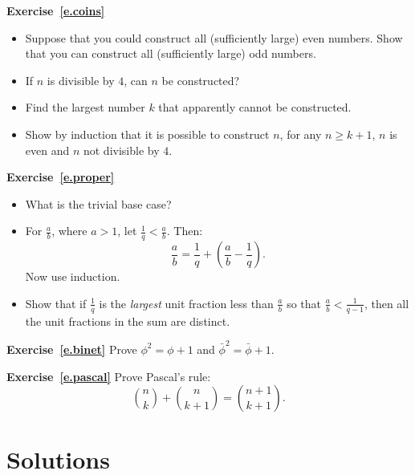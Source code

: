 \documentclass[11pt,a4paper]{report}
\begin{document}
\textbf{Exercise~\ref{e.coins}}
\begin{itemize}
\item Suppose that you could construct all (sufficiently large) even numbers. Show that you can construct all (sufficiently large) odd numbers.
\item If $n$ is divisible by $4$, can $n$ be constructed?
\item Find the largest number $k$ that apparently cannot be constructed.
\item Show by induction that it is possible to construct $n$, for any $n\geq k+1$, $n$ is even and $n$ not divisible by $4$.
\end{itemize}

\medskip

\textbf{Exercise~\ref{e.proper}}
\begin{itemize}
\item What is the trivial base case?
\item For $\frac{a}{b}$, where $a>1$, let $\frac{1}{q} < \frac{a}{b}$. Then:
\[
\frac{a}{b} = \frac{1}{q} + \left( \frac{a}{b} - \frac{1}{q} \right).
\]
Now use induction.
\item Show that if $\frac{1}{q}$ is the \emph{largest} unit fraction less than $\frac{a}{b}$ so that $\frac{a}{b} < \frac{1}{q-1}$, then all the unit fractions in the sum are distinct.
\end{itemize}

\medskip

\textbf{Exercise~\ref{e.binet}} Prove $\phi^2=\phi+1$ and $\bar{\phi}^2=\bar{\phi}+1$.

\medskip

\textbf{Exercise~\ref{e.pascal}}
Prove Pascal's rule:
\[
{n \choose k} + {n \choose k+1} = {n+1 \choose k+1}.
\]


\chapter{Solutions}\label{a.solutions}

\setlength{\jot}{6pt}
\end{document}
